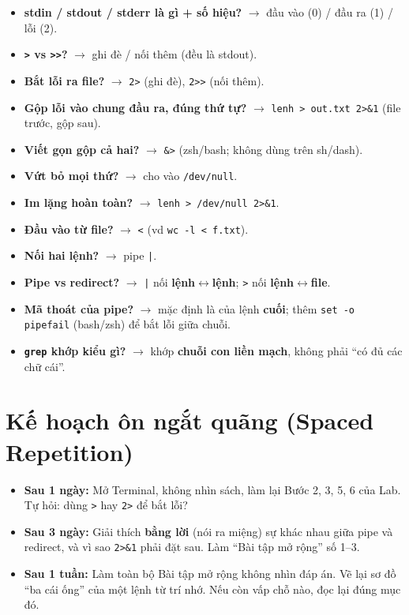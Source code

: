 \documentclass[12pt,a4paper]{article}
\newcommand{\cmd}[1]{\texttt{#1}}
\begin{document}
\begin{itemize}[leftmargin=1.4em]
\item \textbf{stdin / stdout / stderr là gì + số hiệu?} $\rightarrow$ đầu vào (0) / đầu ra (1) / lỗi (2).
\item \textbf{\cmd{>} vs \cmd{>>}?} $\rightarrow$ ghi đè / nối thêm (đều là stdout).
\item \textbf{Bắt lỗi ra file?} $\rightarrow$ \cmd{2>} (ghi đè), \cmd{2>>} (nối thêm).
\item \textbf{Gộp lỗi vào chung đầu ra, đúng thứ tự?} $\rightarrow$ \cmd{lenh > out.txt 2>\&1} (file trước, gộp sau).
\item \textbf{Viết gọn gộp cả hai?} $\rightarrow$ \cmd{\&>} (zsh/bash; không dùng trên sh/dash).
\item \textbf{Vứt bỏ mọi thứ?} $\rightarrow$ cho vào \cmd{/dev/null}.
\item \textbf{Im lặng hoàn toàn?} $\rightarrow$ \cmd{lenh > /dev/null 2>\&1}.
\item \textbf{Đầu vào từ file?} $\rightarrow$ \cmd{<} (vd \cmd{wc -l < f.txt}).
\item \textbf{Nối hai lệnh?} $\rightarrow$ pipe \cmd{|}.
\item \textbf{Pipe vs redirect?} $\rightarrow$ \cmd{|} nối \textbf{lệnh$\leftrightarrow$lệnh}; \cmd{>} nối \textbf{lệnh$\leftrightarrow$file}.
\item \textbf{Mã thoát của pipe?} $\rightarrow$ mặc định là của lệnh \textbf{cuối}; thêm \cmd{set -o pipefail} (bash/zsh) để bắt lỗi giữa chuỗi.
\item \textbf{\cmd{grep} khớp kiểu gì?} $\rightarrow$ khớp \textbf{chuỗi con liền mạch}, không phải ``có đủ các chữ cái''.
\end{itemize}

\section{Kế hoạch ôn ngắt quãng (Spaced Repetition)}

\begin{itemize}[leftmargin=1.4em]
\item \textbf{Sau 1 ngày:} Mở Terminal, không nhìn sách, làm lại Bước 2, 3, 5, 6 của Lab. Tự hỏi: dùng \cmd{>} hay \cmd{2>} để bắt lỗi?
\item \textbf{Sau 3 ngày:} Giải thích \textbf{bằng lời} (nói ra miệng) sự khác nhau giữa pipe và redirect, và vì sao \cmd{2>\&1} phải đặt sau. Làm ``Bài tập mở rộng'' số 1--3.
\item \textbf{Sau 1 tuần:} Làm toàn bộ Bài tập mở rộng không nhìn đáp án. Vẽ lại sơ đồ ``ba cái ống'' của một lệnh từ trí nhớ. Nếu còn vấp chỗ nào, đọc lại đúng mục đó.
\end{itemize}
\end{document}
